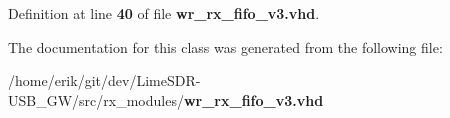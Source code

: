 Definition at line {\bf 40} of file {\bf wr\+\_\+rx\+\_\+fifo\+\_\+v3.\+vhd}.



The documentation for this class was generated from the following file\+:\begin{DoxyCompactItemize}
\item 
/home/erik/git/dev/\+Lime\+S\+D\+R-\/\+U\+S\+B\+\_\+\+G\+W/src/rx\+\_\+modules/{\bf wr\+\_\+rx\+\_\+fifo\+\_\+v3.\+vhd}\end{DoxyCompactItemize}
